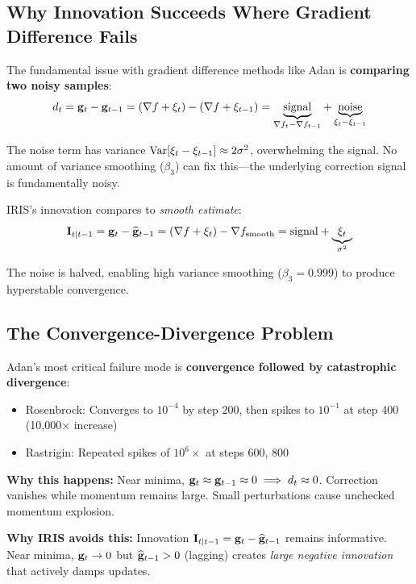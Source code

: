 \subsection{Why Innovation Succeeds Where Gradient Difference Fails}

The fundamental issue with gradient difference methods like Adan is \textbf{comparing two noisy samples}:
\begin{equation}
d_t = \mathbf{g}_t - \mathbf{g}_{t-1} = (\nabla f + \xi_t) - (\nabla f + \xi_{t-1}) = \underbrace{\text{signal}}_{\nabla f_t - \nabla f_{t-1}} + \underbrace{\text{noise}}_{\xi_t - \xi_{t-1}}
\end{equation}

The noise term has variance $\operatorname{Var}[\xi_t - \xi_{t-1}] \approx 2\sigma^2$, overwhelming the signal. No amount of variance smoothing ($\beta_3$) can fix this---the underlying correction signal is fundamentally noisy.

IRIS's innovation compares to \emph{smooth estimate}:
\begin{equation}
\mathbf{I}_{t|t-1} = \mathbf{g}_t - \widehat{\mathbf{g}}_{t-1} = (\nabla f + \xi_t) - \nabla f_{\text{smooth}} = \text{signal} + \underbrace{\xi_t}_{\sigma^2}
\end{equation}

The noise is halved, enabling high variance smoothing ($\beta_3 = 0.999$) to produce hyperstable convergence.

\subsection{The Convergence-Divergence Problem}

Adan's most critical failure mode is \textbf{convergence followed by catastrophic divergence}:
\begin{itemize}
    \item Rosenbrock: Converges to $10^{-4}$ by step 200, then spikes to $10^{-1}$ at step 400 (10,000$\times$ increase)
    \item Rastrigin: Repeated spikes of $10^6\times$ at steps 600, 800
\end{itemize}

\textbf{Why this happens:} Near minima, $\mathbf{g}_t \approx \mathbf{g}_{t-1} \approx 0 \implies d_t \approx 0$. Correction vanishes while momentum remains large. Small perturbations cause unchecked momentum explosion.

\textbf{Why IRIS avoids this:} Innovation $\mathbf{I}_{t|t-1} = \mathbf{g}_t - \widehat{\mathbf{g}}_{t-1}$ remains informative. Near minima, $\mathbf{g}_t \to 0$ but $\widehat{\mathbf{g}}_{t-1} > 0$ (lagging) creates \emph{large negative innovation} that actively damps updates.

